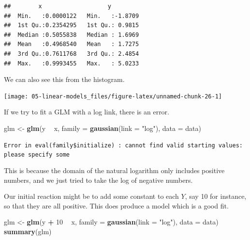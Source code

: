 \documentclass[openany]{book}
\newenvironment{Shaded}{\begin{snugshade}}{\end{snugshade}}
\newcommand{\DataTypeTok}[1]{\textcolor[rgb]{0.13,0.29,0.53}{#1}}
\newcommand{\DecValTok}[1]{\textcolor[rgb]{0.00,0.00,0.81}{#1}}
\newcommand{\FloatTok}[1]{\textcolor[rgb]{0.00,0.00,0.81}{#1}}
\newcommand{\KeywordTok}[1]{\textcolor[rgb]{0.13,0.29,0.53}{\textbf{#1}}}
\newcommand{\NormalTok}[1]{#1}
\newcommand{\OperatorTok}[1]{\textcolor[rgb]{0.81,0.36,0.00}{\textbf{#1}}}
\newcommand{\StringTok}[1]{\textcolor[rgb]{0.31,0.60,0.02}{#1}}
\begin{document}
\begin{verbatim}
##        x                   y          
##  Min.   :0.0000122   Min.   :-1.8709  
##  1st Qu.:0.2354295   1st Qu.: 0.9815  
##  Median :0.5055838   Median : 1.6969  
##  Mean   :0.4968540   Mean   : 1.7275  
##  3rd Qu.:0.7611768   3rd Qu.: 2.4854  
##  Max.   :0.9993455   Max.   : 5.0233
\end{verbatim}

We can also see this from the histogram.

\begin{Shaded}
\end{Shaded}

\begin{center}\texttt{[image: 05-linear-models\_files/figure-latex/unnamed-chunk-26-1]} \end{center}

If we try to fit a GLM with a log link, there is an error.

\begin{Shaded}
\begin{Highlighting}[]
\NormalTok{glm <-}\StringTok{ }\KeywordTok{glm}\NormalTok{(y }\OperatorTok{~}\StringTok{ }\NormalTok{x, }\DataTypeTok{family =} \KeywordTok{gaussian}\NormalTok{(}\DataTypeTok{link =} \StringTok{"log"}\NormalTok{), }\DataTypeTok{data =}\NormalTok{ data)}
\end{Highlighting}
\end{Shaded}

\texttt{Error\ in\ eval(family\$initialize)\ :\ cannot\ find\ valid\ starting\ values:\ please\ specify\ some}

This is because the domain of the natural logarithm only includes positive numbers, and we just tried to take the log of negative numbers.

Our initial reaction might be to add some constant to each \(Y\), say 10 for instance, so that they are all positive. This does produce a model which is a good fit.

\begin{Shaded}
\begin{Highlighting}[]
\NormalTok{glm <-}\StringTok{ }\KeywordTok{glm}\NormalTok{(y }\OperatorTok{+}\StringTok{ }\DecValTok{10} \OperatorTok{~}\StringTok{ }\NormalTok{x, }\DataTypeTok{family =} \KeywordTok{gaussian}\NormalTok{(}\DataTypeTok{link =} \StringTok{"log"}\NormalTok{), }\DataTypeTok{data =}\NormalTok{ data)}
\KeywordTok{summary}\NormalTok{(glm)}
\end{Highlighting}
\end{Shaded}
\end{document}
